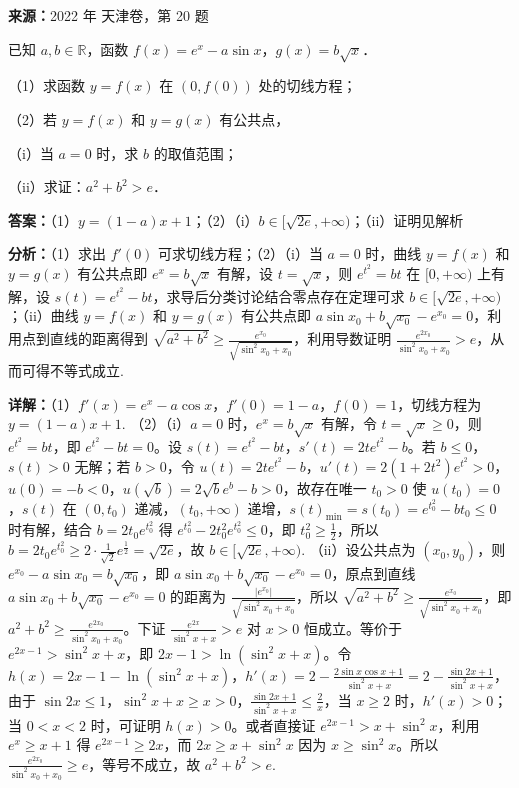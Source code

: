 \begin{question}[points=15]
\textbf{来源：}2022 年 天津卷，第 20 题\par
已知 $a,b\in\mathbb{R}$，函数 $f(x)=e^x-a\sin x$，$g(x)=b\sqrt{x}$．

（1）求函数 $y=f(x)$ 在 $(0,f(0))$ 处的切线方程；

（2）若 $y=f(x)$ 和 $y=g(x)$ 有公共点，

（i）当 $a=0$ 时，求 $b$ 的取值范围；

（ii）求证：$a^2+b^2>e$．
\begin{solution}
\textbf{答案：}（1）$y=(1-a)x+1$；（2）（i）$b\in[\sqrt{2e},+\infty)$；（ii）证明见解析

\textbf{分析：}（1）求出 $f'(0)$ 可求切线方程；（2）（i）当 $a=0$ 时，曲线 $y=f(x)$ 和 $y=g(x)$ 有公共点即 $e^x=b\sqrt{x}$ 有解，设 $t=\sqrt{x}$，则 $e^{t^2}=bt$ 在 $[0,+\infty)$ 上有解，设 $s(t)=e^{t^2}-bt$，求导后分类讨论结合零点存在定理可求 $b\in[\sqrt{2e},+\infty)$；（ii）曲线 $y=f(x)$ 和 $y=g(x)$ 有公共点即 $a\sin x_0+b\sqrt{x_0}-e^{x_0}=0$，利用点到直线的距离得到 $\sqrt{a^2+b^2}\ge\frac{e^{x_0}}{\sqrt{\sin^2 x_0+x_0}}$，利用导数证明 $\frac{e^{2x_0}}{\sin^2 x_0+x_0}>e$，从而可得不等式成立.

\textbf{详解：}（1）$f'(x)=e^x-a\cos x$，$f'(0)=1-a$，$f(0)=1$，切线方程为 $y=(1-a)x+1$.
（2）（i）$a=0$ 时，$e^x=b\sqrt{x}$ 有解，令 $t=\sqrt{x}\ge0$，则 $e^{t^2}=bt$，即 $e^{t^2}-bt=0$。设 $s(t)=e^{t^2}-bt$，$s'(t)=2te^{t^2}-b$。若 $b\le0$，$s(t)>0$ 无解；若 $b>0$，令 $u(t)=2te^{t^2}-b$，$u'(t)=2(1+2t^2)e^{t^2}>0$，$u(0)=-b<0$，$u(\sqrt{b})=2\sqrt{b}e^{b}-b>0$，故存在唯一 $t_0>0$ 使 $u(t_0)=0$，$s(t)$ 在 $(0,t_0)$ 递减，$(t_0,+\infty)$ 递增，$s(t)_{\min}=s(t_0)=e^{t_0^2}-bt_0\le0$ 时有解，结合 $b=2t_0e^{t_0^2}$ 得 $e^{t_0^2}-2t_0^2e^{t_0^2}\le0$，即 $t_0^2\ge\frac{1}{2}$，所以 $b=2t_0e^{t_0^2}\ge2\cdot\frac{1}{\sqrt{2}}e^{\frac{1}{2}}=\sqrt{2e}$，故 $b\in[\sqrt{2e},+\infty)$.
（ii）设公共点为 $(x_0,y_0)$，则 $e^{x_0}-a\sin x_0=b\sqrt{x_0}$，即 $a\sin x_0+b\sqrt{x_0}-e^{x_0}=0$，原点到直线 $a\sin x_0+b\sqrt{x_0}-e^{x_0}=0$ 的距离为 $\frac{|e^{x_0}|}{\sqrt{\sin^2 x_0+x_0}}$，所以 $\sqrt{a^2+b^2}\ge\frac{e^{x_0}}{\sqrt{\sin^2 x_0+x_0}}$，即 $a^2+b^2\ge\frac{e^{2x_0}}{\sin^2 x_0+x_0}$。下证 $\frac{e^{2x}}{\sin^2 x+x}>e$ 对 $x>0$ 恒成立。等价于 $e^{2x-1}>\sin^2 x+x$，即 $2x-1>\ln(\sin^2 x+x)$。令 $h(x)=2x-1-\ln(\sin^2 x+x)$，$h'(x)=2-\frac{2\sin x\cos x+1}{\sin^2 x+x}=2-\frac{\sin2x+1}{\sin^2 x+x}$，由于 $\sin2x\le1$，$\sin^2 x+x\ge x>0$，$\frac{\sin2x+1}{\sin^2 x+x}\le\frac{2}{x}$，当 $x\ge2$ 时，$h'(x)>0$；当 $0<x<2$ 时，可证明 $h(x)>0$。或者直接证 $e^{2x-1}>x+\sin^2 x$，利用 $e^x\ge x+1$ 得 $e^{2x-1}\ge2x$，而 $2x\ge x+\sin^2 x$ 因为 $x\ge\sin^2 x$。所以 $\frac{e^{2x_0}}{\sin^2 x_0+x_0}\ge e$，等号不成立，故 $a^2+b^2>e$.
\end{solution}
\end{question}

